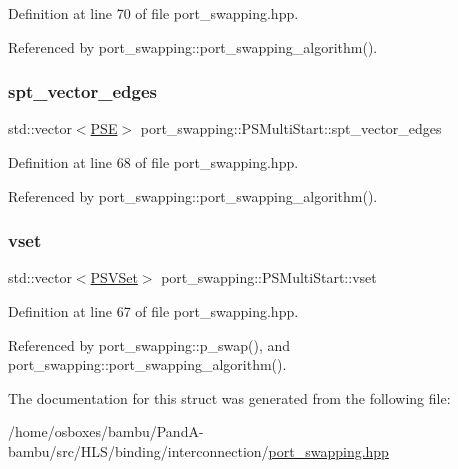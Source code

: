 Definition at line 70 of file port\+\_\+swapping.\+hpp.



Referenced by port\+\_\+swapping\+::port\+\_\+swapping\+\_\+algorithm().

\mbox{\label{structport__swapping_1_1PSMultiStart_ad1f8e79102da09a136580faceba55279}} 
\subsubsection{\texorpdfstring{spt\+\_\+vector\+\_\+edges}{spt\_vector\_edges}}
{\footnotesize\ttfamily std\+::vector$<$\hyperlink{classport__swapping_ac98b23b7c2dd3f3792327fb666489d66}{P\+SE}$>$ port\+\_\+swapping\+::\+P\+S\+Multi\+Start\+::spt\+\_\+vector\+\_\+edges}



Definition at line 68 of file port\+\_\+swapping.\+hpp.



Referenced by port\+\_\+swapping\+::port\+\_\+swapping\+\_\+algorithm().

\mbox{\label{structport__swapping_1_1PSMultiStart_a13e1f84d967b48cae042840f7e33eee3}} 
\subsubsection{\texorpdfstring{vset}{vset}}
{\footnotesize\ttfamily std\+::vector$<$\hyperlink{structport__swapping_1_1PSVSet}{P\+S\+V\+Set}$>$ port\+\_\+swapping\+::\+P\+S\+Multi\+Start\+::vset}



Definition at line 67 of file port\+\_\+swapping.\+hpp.



Referenced by port\+\_\+swapping\+::p\+\_\+swap(), and port\+\_\+swapping\+::port\+\_\+swapping\+\_\+algorithm().



The documentation for this struct was generated from the following file\+:\begin{DoxyCompactItemize}
\item 
/home/osboxes/bambu/\+Pand\+A-\/bambu/src/\+H\+L\+S/binding/interconnection/\hyperlink{port__swapping_8hpp}{port\+\_\+swapping.\+hpp}\end{DoxyCompactItemize}
